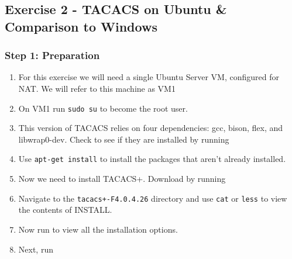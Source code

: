 \documentclass[main.tex]{subfiles}
\begin{document}
\subsection{Exercise 2 - TACACS on Ubuntu & Comparison to Windows }
\begin{itemize}

\subsubsection{Step 1: Preparation}

\begin{enumerate}[noitemsep,label=$\bullet$,leftmargin=20mm,labelsep=0.5cm]    
    
    \item For this exercise we will need a single Ubuntu Server VM, configured for NAT. We will refer to this machine as VM1
    
    \item On VM1 run \texttt{sudo su} to become the root user.
    
    \item This version of TACACS relies on four dependencies: gcc, bison, flex, and libwrap0-dev. Check to see if they are installed by running 

 

     \item Use \texttt{apt-get install} to install the packages that aren't already installed.
     
\item Now we need to install TACACS+. Download by running 

     
     \item Navigate to the \texttt{tacacs+-F4.0.4.26} directory and use \texttt{cat} or \texttt{less} to view the contents of INSTALL.
     

     \item Now run 
     to view all the installation options.
     
    \item Next, run 
    

\end{enumerate}
\end{itemize}
\end{document}
